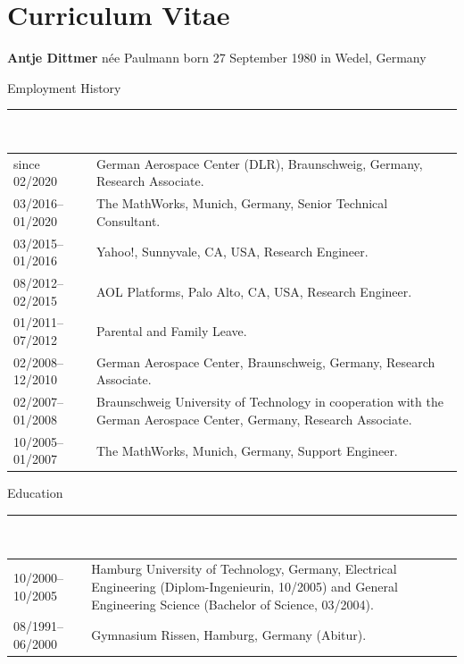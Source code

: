 \chapter*{Curriculum Vitae}
{}
\noindent\textbf{\large Antje Dittmer} \large  n\'ee Paulmann \normalsize born 27 September 1980 in Wedel, Germany
\bigskip

\large Employment History\\[-8pt]
\noindent\rule{15.25cm}{0.4pt}\\[3pt]
\normalsize
\begin{tabular}{@{}p{3.2cm}p{11.3cm}@{}}
    since 02/2020 & German Aerospace Center (DLR), Braunschweig, Germany, %
    Research Associate. \\[20pt]
    03/2016--01/2020 & The MathWorks, Munich, Germany, %
    Senior Technical Consultant. \\[7pt]
    03/2015--01/2016 & Yahoo!, Sunnyvale, CA, USA, %
    Research Engineer. \\[7pt]
    08/2012--02/2015 & AOL Platforms, Palo Alto, CA, USA, %
    Research Engineer. \\[7pt]
    01/2011--07/2012 & Parental and Family Leave. \\[7pt]
    02/2008--12/2010 & German Aerospace Center, Braunschweig, Germany, %
    Research Associate. \\[20pt]
    02/2007--01/2008 &  Braunschweig University of Technology in cooperation with the German Aerospace Center, Germany, %
    Research Associate. \\[20pt]
    10/2005--01/2007 & The MathWorks, Munich, Germany, %
    Support Engineer. \\
\end{tabular}

\bigskip
\large Education\\[-8pt]
\noindent\rule{15.25cm}{0.4pt}\\[3pt]
\normalsize
\begin{tabular}{@{}p{3.2cm}p{11.3cm}@{}}
    10/2000--10/2005 & Hamburg University of Technology, Germany, %
    Electrical Engineering (Diplom-Ingenieurin, 10/2005) and 
    General Engineering Science (Bachelor of Science, 03/2004). \\[33pt]
    08/1991--06/2000 & Gymnasium Rissen, Hamburg, Germany %
    (Abitur). \\[9pt]
\end{tabular}

